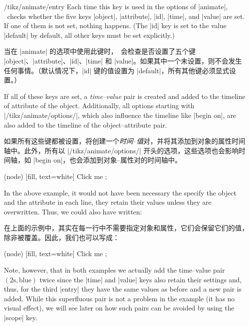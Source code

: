 \begin{key}{/tikz/animate/entry}
    Each time this key is used in the options of |animate|, \tikzname\ checks
    whether the five keys |object|, |attribute|, |id|, |time|, and |value| are
    set. If one of them is not set, nothing happens. (The |id| key is set to
    the value |default| by default, all other keys must be set explicitly.)

    当在 |animate| 的选项中使用此键时，\tikzname\ 会检查是否设置了五个键 |object|、|attribute|、|id|、|time| 和 |value|。如果其中一个未设置，则不会发生任何事情。（默认情况下，|id| 键的值设置为 |default|，所有其他键必须显式设置。）


    If all of these keys are set, a \emph{time--value} pair is created and
    added to the timeline of attribute of the object. Additionally, all options
    starting with |/tikz/animate/options/|, which also influence the timeline
    like |begin on|, are also added to the timeline of the object--attribute
    pair.
    
    如果所有这些键都被设置，将创建一个\emph{时间--值}对，并将其添加到对象的属性时间轴中。此外，所有以 |/tikz/animate/options/| 开头的选项，这些选项也会影响时间轴，如 |begin on|，也会添加到对象--属性对的时间轴中。


\begin{codeexample}[
    preamble={\usetikzlibrary{animations}},
    animation list={0.5,1,1.5,2},
]
\tikz [animate = {
  object = node, attribute = fill, time = 0s, value = red, entry,
  object = node, attribute = fill, time = 2s, value = blue, entry,
  object = node, attribute = fill, begin on = click, entry}]
  \node (node) [fill, text=white] { Click me };
\end{codeexample}
    In the above example, it would not have been necessary the specify the
    object and the attribute in each line, they retain their values unless they
    are overwritten. Thus, we could also have written:
    
    在上面的示例中，其实在每一行中不需要指定对象和属性，它们会保留它们的值，除非被覆盖。因此，我们也可以写成：


\begin{codeexample}[
    preamble={\usetikzlibrary{animations}},
    animation list={0.5,1,1.5,2},
]
\tikz [animate = {
  object = node, attribute = fill, time = 0s, value = red, entry,
                                   time = 2s, value = blue, entry,
                                   begin on = click, entry}]
  \node (node) [fill, text=white] { Click me };
\end{codeexample}
    Note, however, that in both examples we actually add the time--value pair
    $(2\mathrm{s}, \mathrm{blue})$ twice since the |time| and |value| keys also
    retain their settings and, thus, for the third |entry| they have the same
    values as before and a new pair is added. While this superfluous pair is
    not a problem in the example (it has no visual effect), we will see later
    on how such pairs can be avoided by using the |scope| key.


\end{key}
